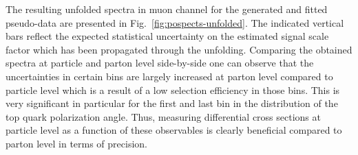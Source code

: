 {\hspace{0.03\textwidth}
}

The resulting unfolded spectra in muon channel for the generated and fitted pseudo-data are presented in Fig.~\ref{fig:pospects-unfolded}. The indicated vertical bars reflect the expected statistical uncertainty on the estimated signal scale factor which has been propagated through the unfolding. Comparing the obtained spectra at particle and parton level side-by-side one can observe that the uncertainties in certain bins are largely increased at parton level compared to particle level which is a result of a low selection efficiency in those bins. This is very significant in particular for the first and last bin in the distribution of the top quark polarization angle. Thus, measuring differential cross sections at particle level as a function of these observables is clearly beneficial compared to parton level in terms of precision.

